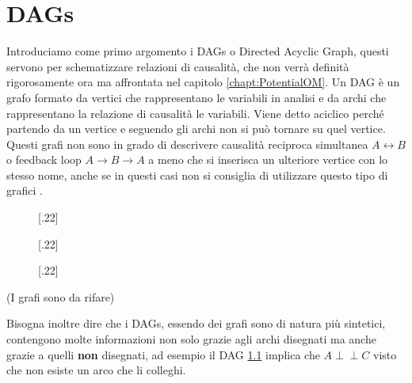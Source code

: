 \chapter{DAGs}
\label{chapt:DAGs}

Introduciamo come primo argomento i DAGs o Directed Acyclic Graph, questi servono per schematizzare relazioni di causalità, che non verrà  
definità rigorosamente ora ma affrontata nel capitolo \ref{chapt:PotentialOM}.
Un DAG è un grafo formato da vertici che rappresentano le variabili in analisi e da archi che rappresentano la relazione di causalità le variabili. Viene detto aciclico perché partendo da un vertice e seguendo gli archi non si può tornare su  quel vertice. Questi grafi non sono in grado di descrivere causalità reciproca simultanea $A \leftrightarrow B $  o feedback loop $A \rightarrow B \rightarrow A$ a meno che si inserisca un ulteriore vertice con lo stesso nome, anche se in questi casi non si consiglia di utilizzare questo tipo di grafici
\citep{cunningham2021causal}.

\begin{figure}[ht]
  [.22\linewidth]{%
  }%
  [.22\linewidth]{%
  }
  [.22\linewidth]{%
  }%
	\label{validDAG}

\end{figure}
(I grafi sono da rifare)

Bisogna inoltre dire che i DAGs, essendo dei grafi sono di natura più sintetici, contengono molte informazioni non solo grazie agli archi disegnati ma anche grazie a quelli \textbf{non} disegnati, ad esempio il DAG \ref{validDAG} implica che $A \perp\!\!\!\perp C$ visto che non esiste un arco che li colleghi. 

